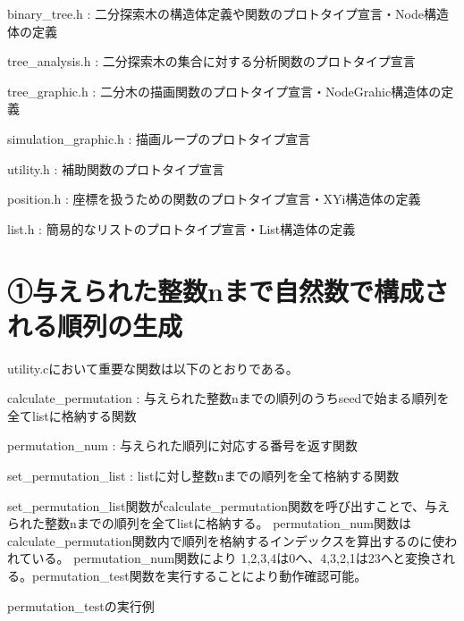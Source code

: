 \documentclass{ltjsarticle}
\begin{document}
\begin{list}{}{\leftmargin=1em}
\item binary\_tree.h : 二分探索木の構造体定義や関数のプロトタイプ宣言・Node構造体の定義
\item tree\_analysis.h : 二分探索木の集合に対する分析関数のプロトタイプ宣言
\item tree\_graphic.h : 二分木の描画関数のプロトタイプ宣言・NodeGrahic構造体の定義
\item simulation\_graphic.h : 描画ループのプロトタイプ宣言
\item utility.h : 補助関数のプロトタイプ宣言
\item position.h : 座標を扱うための関数のプロトタイプ宣言・XYi構造体の定義
\item list.h : 簡易的なリストのプロトタイプ宣言・List構造体の定義
\end{list}

\section{➀与えられた整数nまで自然数で構成される順列の生成}



utility.cにおいて重要な関数は以下のとおりである。

\begin{list}{}{\leftmargin=1em}
\item calculate\_permutation : 与えられた整数nまでの順列のうちseedで始まる順列を全てlistに格納する関数
\item permutation\_num : 与えられた順列に対応する番号を返す関数
\item set\_permutation\_list : listに対し整数nまでの順列を全て格納する関数
\end{list}

set\_permutation\_list関数がcalculate\_permutation関数を呼び出すことで、与えられた整数nまでの順列を全てlistに格納する。
permutation\_num関数はcalculate\_permutation関数内で順列を格納するインデックスを算出するのに使われている。
permutation\_num関数により 1,2,3,4は0へ、4,3,2,1は23へと変換される。permutation\_test関数を実行することにより動作確認可能。

\textrm{permutation\_testの実行例}
\end{document}
